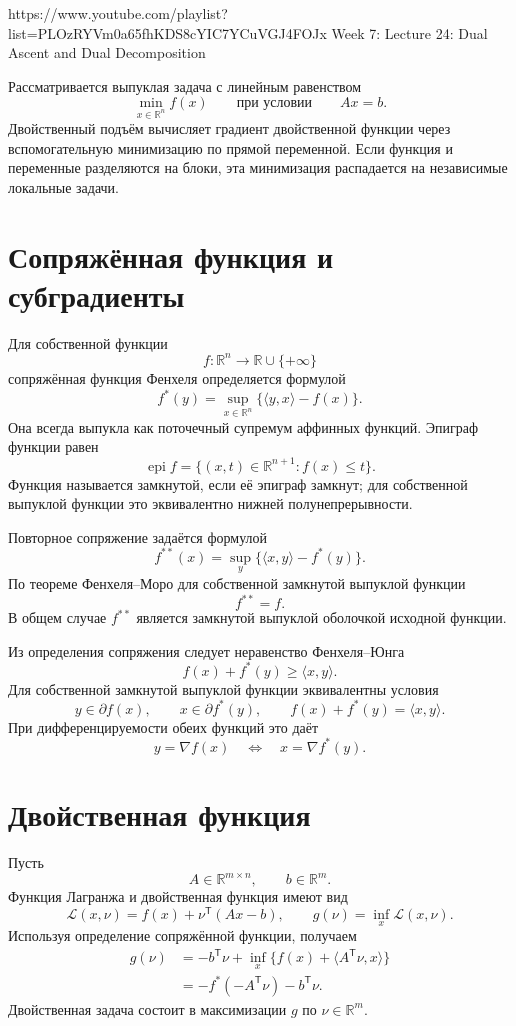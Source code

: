 
\sourcevideo
    {https://www.youtube.com/playlist?list=PLOzRYVm0a65fhKDS8cYIC7YCuVGJ4FOJx}
    {Week 7: Lecture 24: Dual Ascent and Dual Decomposition}

Рассматривается выпуклая задача с линейным равенством
\[
    \min_{x\in\mathbb R^n} f(x)
    \qquad
    \text{при условии}
    \qquad
    Ax=b.
\]
Двойственный подъём вычисляет градиент двойственной функции через
вспомогательную минимизацию по прямой переменной. Если функция и
переменные разделяются на блоки, эта минимизация распадается на
независимые локальные задачи.

\section{Сопряжённая функция и субградиенты}

Для собственной функции
\[
    f\colon\mathbb R^n\to\mathbb R\cup\{+\infty\}
\]
сопряжённая функция Фенхеля определяется формулой
\[
    f^*(y)
    =
    \sup_{x\in\mathbb R^n}
    \bigl\{\langle y,x\rangle-f(x)\bigr\}.
\]
Она всегда выпукла как поточечный супремум аффинных функций.
Эпиграф функции равен
\[
    \operatorname{epi}f
    =
    \bigl\{(x,t)\in\mathbb R^{n+1}:f(x)\le t\bigr\}.
\]
Функция называется замкнутой, если её эпиграф замкнут; для собственной
выпуклой функции это эквивалентно нижней полунепрерывности.

Повторное сопряжение задаётся формулой
\[
    f^{**}(x)
    =
    \sup_y\bigl\{\langle x,y\rangle-f^*(y)\bigr\}.
\]
По теореме Фенхеля--Моро для собственной замкнутой выпуклой функции
\[
    f^{**}=f.
\]
В общем случае \(f^{**}\) является замкнутой выпуклой оболочкой
исходной функции.

Из определения сопряжения следует неравенство Фенхеля--Юнга
\[
    f(x)+f^*(y)\ge \langle x,y\rangle.
\]
Для собственной замкнутой выпуклой функции эквивалентны условия
\[
    y\in\partial f(x),
    \qquad
    x\in\partial f^*(y),
    \qquad
    f(x)+f^*(y)=\langle x,y\rangle.
\]
При дифференцируемости обеих функций это даёт
\[
    y=\nabla f(x)
    \quad\Longleftrightarrow\quad
    x=\nabla f^*(y).
\]

\section{Двойственная функция}

Пусть
\[
    A\in\mathbb R^{m\times n},
    \qquad
    b\in\mathbb R^m.
\]
Функция Лагранжа и двойственная функция имеют вид
\[
    \mathcal L(x,\nu)
    =
    f(x)+\nu^{\mathsf T}(Ax-b),
    \qquad
    g(\nu)=\inf_x\mathcal L(x,\nu).
\]
Используя определение сопряжённой функции, получаем
\[
\begin{aligned}
    g(\nu)
    &=
    -b^{\mathsf T}\nu
    +
    \inf_x
    \bigl\{f(x)+\langle A^{\mathsf T}\nu,x\rangle\bigr\}
    \\
    &=
    -f^*(-A^{\mathsf T}\nu)-b^{\mathsf T}\nu.
\end{aligned}
\]
Двойственная задача состоит в максимизации \(g\) по
\(\nu\in\mathbb R^m\).

